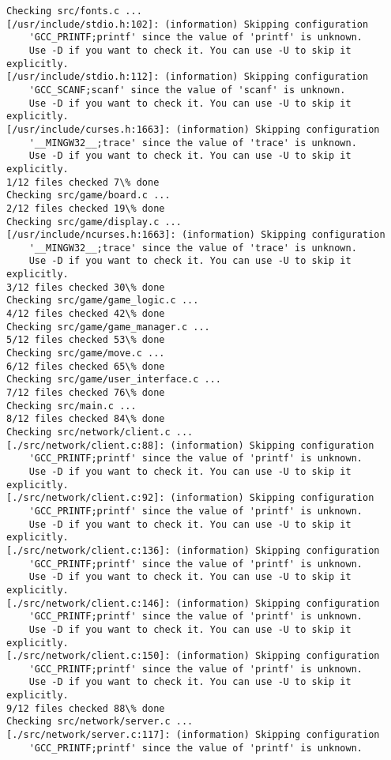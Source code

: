 \documentclass[letterpaper]{article}
\begin{document}
\begin{lstlisting}
Checking src/fonts.c ...
[/usr/include/stdio.h:102]: (information) Skipping configuration
    'GCC_PRINTF;printf' since the value of 'printf' is unknown.
    Use -D if you want to check it. You can use -U to skip it explicitly.
[/usr/include/stdio.h:112]: (information) Skipping configuration
    'GCC_SCANF;scanf' since the value of 'scanf' is unknown.
    Use -D if you want to check it. You can use -U to skip it explicitly.
[/usr/include/curses.h:1663]: (information) Skipping configuration
    '__MINGW32__;trace' since the value of 'trace' is unknown.
    Use -D if you want to check it. You can use -U to skip it explicitly.
1/12 files checked 7\% done
Checking src/game/board.c ...
2/12 files checked 19\% done
Checking src/game/display.c ...
[/usr/include/ncurses.h:1663]: (information) Skipping configuration
    '__MINGW32__;trace' since the value of 'trace' is unknown.
    Use -D if you want to check it. You can use -U to skip it explicitly.
3/12 files checked 30\% done
Checking src/game/game_logic.c ...
4/12 files checked 42\% done
Checking src/game/game_manager.c ...
5/12 files checked 53\% done
Checking src/game/move.c ...
6/12 files checked 65\% done
Checking src/game/user_interface.c ...
7/12 files checked 76\% done
Checking src/main.c ...
8/12 files checked 84\% done
Checking src/network/client.c ...
[./src/network/client.c:88]: (information) Skipping configuration
    'GCC_PRINTF;printf' since the value of 'printf' is unknown.
    Use -D if you want to check it. You can use -U to skip it explicitly.
[./src/network/client.c:92]: (information) Skipping configuration
    'GCC_PRINTF;printf' since the value of 'printf' is unknown.
    Use -D if you want to check it. You can use -U to skip it explicitly.
[./src/network/client.c:136]: (information) Skipping configuration
    'GCC_PRINTF;printf' since the value of 'printf' is unknown.
    Use -D if you want to check it. You can use -U to skip it explicitly.
[./src/network/client.c:146]: (information) Skipping configuration
    'GCC_PRINTF;printf' since the value of 'printf' is unknown.
    Use -D if you want to check it. You can use -U to skip it explicitly.
[./src/network/client.c:150]: (information) Skipping configuration
    'GCC_PRINTF;printf' since the value of 'printf' is unknown.
    Use -D if you want to check it. You can use -U to skip it explicitly.
9/12 files checked 88\% done
Checking src/network/server.c ...
[./src/network/server.c:117]: (information) Skipping configuration
    'GCC_PRINTF;printf' since the value of 'printf' is unknown.

\end{lstlisting}
\end{document}
